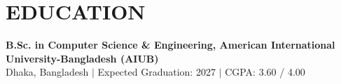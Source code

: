 \documentclass[9.5pt,a4paper]{article}
\begin{document}
\section*{EDUCATION}
\textbf{B.Sc. in Computer Science \& Engineering, American International University-Bangladesh (AIUB)} \\
Dhaka, Bangladesh \quad $|$ \quad Expected Graduation: 2027 \quad $|$ \quad CGPA: 3.60 / 4.00
\end{document}
